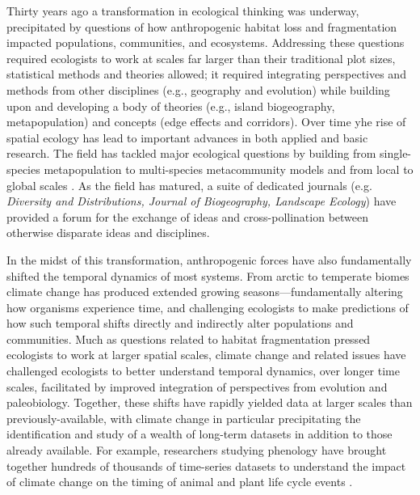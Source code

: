 \documentclass[11pt,a4paper,oneside]{article}
\begin{document}
\newpage
\linenumbers

Thirty years ago a transformation in ecological thinking was underway, precipitated by questions of how anthropogenic habitat loss and fragmentation impacted populations, communities, and ecosystems. Addressing these questions required ecologists to work at scales far larger than their traditional plot sizes, statistical methods and theories allowed; it required integrating perspectives and methods from other disciplines (e.g., geography and evolution) while building upon and developing a body of theories (e.g., island biogeography, metapopulation) and concepts (edge effects and corridors). Over time yhe rise of spatial ecology has lead to important advances in both applied and basic research. The field has tackled major ecological questions by building from single-species metapopulation to multi-species metacommunity models \citep{Pillai2011} and from local to global scales \citep{bell2001}. As the field has matured, a suite of dedicated journals  (e.g. \emph{Diversity and Distributions, Journal of Biogeography, Landscape Ecology}) have provided a forum for the exchange of ideas and cross-pollination between otherwise disparate ideas and disciplines. %

In the midst of this transformation, anthropogenic forces have also fundamentally shifted the temporal dynamics of most systems. From arctic to temperate biomes climate change has produced extended growing seasons---fundamentally altering how organisms experience time, and challenging ecologists to make predictions of how such temporal shifts directly and indirectly alter populations and communities. Much as questions related to habitat fragmentation pressed ecologists to work at larger spatial scales, climate change and related issues have challenged ecologists to better understand temporal dynamics, over longer time scales, facilitated by improved integration of perspectives from evolution and paleobiology. Together, these shifts have rapidly yielded data at larger scales than previously-available, with climate change in particular precipitating the identification and study of a wealth of long-term datasets in addition to those already available. For example, researchers studying phenology have brought together hundreds of thousands of time-series datasets to understand the impact of climate change on the timing of animal and plant life cycle events \citep{Menzel:2006sq,Parmesan:2007tv}.\\
\end{document}
